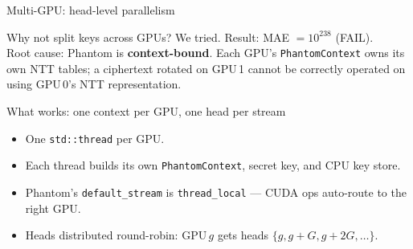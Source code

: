 \documentclass[aspectratio=169]{beamer}
\begin{document}
\begin{frame}{Multi-GPU: head-level parallelism}
  \begin{block}{Why not split keys across GPUs?}
    We tried. Result: MAE $= 10^{238}$ (FAIL).\\
    \footnotesize
    Root cause: Phantom is \textbf{context-bound}. Each GPU's
    \texttt{PhantomContext} owns its own NTT tables; a ciphertext rotated on
    GPU\,1 cannot be correctly operated on using GPU\,0's NTT representation.
    \normalsize
  \end{block}
  \pause
  \begin{block}{What works: one context per GPU, one head per stream}
    \begin{itemize}\small
      \item One \texttt{std::thread} per GPU.
      \item Each thread builds its own \texttt{PhantomContext}, secret key,
            and CPU key store.
      \item Phantom's \texttt{default\_stream} is \texttt{thread\_local} — CUDA ops
            auto-route to the right GPU.
      \item Heads distributed round-robin: GPU\,$g$ gets heads
            $\{g, g{+}G, g{+}2G,\dots\}$.
    \end{itemize}
  \end{block}
\end{frame}
\end{document}
